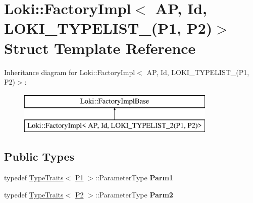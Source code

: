 \hypertarget{structLoki_1_1FactoryImpl_3_01AP_00_01Id_00_01LOKI__TYPELIST__2_07P1_00_01P2_08_4}{}\section{Loki\+:\+:Factory\+Impl$<$ A\+P, Id, L\+O\+K\+I\+\_\+\+T\+Y\+P\+E\+L\+I\+S\+T\+\_(P1, P2)$>$ Struct Template Reference}
\label{structLoki_1_1FactoryImpl_3_01AP_00_01Id_00_01LOKI__TYPELIST__2_07P1_00_01P2_08_4}
Inheritance diagram for Loki\+:\+:Factory\+Impl$<$ A\+P, Id, L\+O\+K\+I\+\_\+\+T\+Y\+P\+E\+L\+I\+S\+T\+\_(P1, P2)$>$\+:\begin{figure}[H]
\begin{center}
\leavevmode
\includegraphics[height=2.000000cm]{structLoki_1_1FactoryImpl_3_01AP_00_01Id_00_01LOKI__TYPELIST__2_07P1_00_01P2_08_4}
\end{center}
\end{figure}
\subsection*{Public Types}
\begin{DoxyCompactItemize}
\item 
\hypertarget{structLoki_1_1FactoryImpl_3_01AP_00_01Id_00_01LOKI__TYPELIST__2_07P1_00_01P2_08_4_ae3b9f3bc19e6808f0f87f67e4c6a4c22}{}typedef \hyperlink{classLoki_1_1TypeTraits}{Type\+Traits}$<$ \hyperlink{structP1}{P1} $>$\+::Parameter\+Type {\bfseries Parm1}\label{structLoki_1_1FactoryImpl_3_01AP_00_01Id_00_01LOKI__TYPELIST__2_07P1_00_01P2_08_4_ae3b9f3bc19e6808f0f87f67e4c6a4c22}

\item 
\hypertarget{structLoki_1_1FactoryImpl_3_01AP_00_01Id_00_01LOKI__TYPELIST__2_07P1_00_01P2_08_4_accd4523557f6233a75e03c8d807ae18c}{}typedef \hyperlink{classLoki_1_1TypeTraits}{Type\+Traits}$<$ \hyperlink{structP2}{P2} $>$\+::Parameter\+Type {\bfseries Parm2}\label{structLoki_1_1FactoryImpl_3_01AP_00_01Id_00_01LOKI__TYPELIST__2_07P1_00_01P2_08_4_accd4523557f6233a75e03c8d807ae18c}

\end{DoxyCompactItemize}
